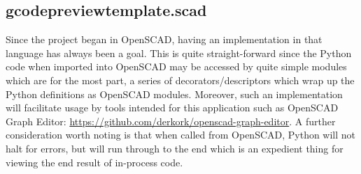 \documentclass{ltxdoc}
\begin{document}
%
%
%
%
%
%
%
%
%
%

%

\subsection{gcodepreviewtemplate.scad}

Since the project began in OpenSCAD, having an implementation in that language has always been a goal. This is quite straight-forward since the Python code when imported into OpenSCAD may be accessed by quite simple modules which are for the most part, a series of decorators/descriptors which wrap up the Python definitions as OpenSCAD modules. Moreover, such an implementation will facilitate usage by tools intended for this application such as OpenSCAD Graph Editor: \url{https://github.com/derkork/openscad-graph-editor}. A further consideration worth noting is that when called from OpenSCAD, Python will not halt for errors, but will run through to the end which is an expedient thing for viewing the end result of in-process code.
\end{document}
